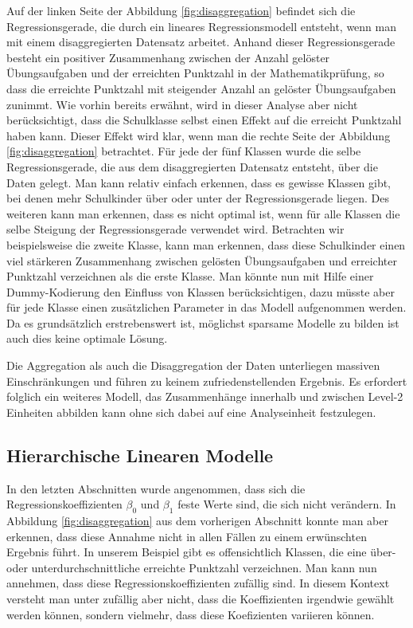 \documentclass[12pt]{article}\usepackage[]{graphicx}\usepackage[]{color}
\numberwithin{equation}{section}
\begin{document}
Auf der linken Seite der Abbildung \ref{fig:disaggregation} befindet sich die Regressionsgerade, die durch ein lineares Regressionsmodell entsteht, wenn man mit einem disaggregierten Datensatz arbeitet. Anhand dieser Regressionsgerade besteht ein positiver Zusammenhang zwischen der Anzahl gelöster Übungsaufgaben und der erreichten Punktzahl in der Mathematikprüfung, so dass die erreichte Punktzahl mit steigender Anzahl an gelöster Übungsaufgaben zunimmt. Wie vorhin bereits erwähnt, wird in dieser Analyse aber nicht berücksichtigt, dass die Schulklasse selbst einen Effekt auf die erreicht Punktzahl haben kann. Dieser Effekt wird klar, wenn man die rechte Seite der Abbildung \ref{fig:disaggregation} betrachtet. Für jede der fünf Klassen wurde die selbe Regressionsgerade, die aus dem disaggregierten Datensatz entsteht, über die Daten gelegt. Man kann relativ einfach erkennen, dass es gewisse Klassen gibt, bei  denen mehr Schulkinder über oder unter der Regressionsgerade liegen. Des weiteren kann man erkennen, dass es nicht optimal ist, wenn für alle Klassen die selbe Steigung der Regressionsgerade verwendet wird. Betrachten wir beispielsweise die zweite Klasse, kann man erkennen, dass diese Schulkinder einen viel stärkeren Zusammenhang zwischen gelösten Übungsaufgaben und erreichter Punktzahl verzeichnen als die erste Klasse. Man könnte nun mit Hilfe einer Dummy-Kodierung den Einfluss von Klassen berücksichtigen, dazu müsste aber für jede Klasse einen zusätzlichen Parameter in das Modell aufgenommen werden. Da es grundsätzlich erstrebenswert ist, möglichst sparsame Modelle zu bilden ist auch dies keine optimale Lösung.

Die Aggregation als auch die Disaggregation der Daten unterliegen massiven Einschränkungen und führen zu keinem zufriedenstellenden Ergebnis. Es erfordert folglich ein weiteres Modell, das Zusammenhänge innerhalb und zwischen Level-2 Einheiten abbilden kann ohne sich dabei auf eine Analyseinheit festzulegen.


\subsection{Hierarchische Linearen Modelle}
In den letzten Abschnitten wurde angenommen, dass sich die Regressionskoeffizienten $\beta_0$ und $\beta_1$ feste Werte sind, die sich nicht verändern. In Abbildung \ref{fig:disaggregation} aus dem vorherigen Abschnitt konnte man aber erkennen, dass diese Annahme nicht in allen Fällen zu einem erwünschten Ergebnis führt. In unserem Beispiel gibt es offensichtlich Klassen, die eine über- oder unterdurchschnittliche erreichte Punktzahl verzeichnen. Man kann nun annehmen, dass diese Regressionskoeffizienten zufällig sind. In diesem Kontext versteht man unter zufällig aber nicht, dass die Koeffizienten irgendwie gewählt werden können, sondern vielmehr, dass diese Koefizienten variieren können. 
\end{document}
